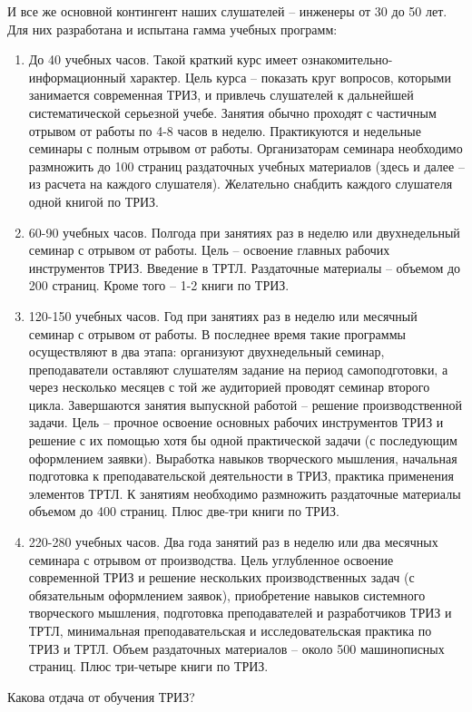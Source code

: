 \documentclass[11pt,a4paper]{article}
\begin{document}
И все же основной контингент наших слушателей -- инженеры от 30 до 50 лет. Для
них разработана и испытана гамма учебных программ:
\begin{enumerate}
\item До 40 учебных часов. Такой краткий курс имеет
  ознакомительно-информационный характер. Цель курса -- показать круг
  вопросов, которыми занимается современная ТРИЗ, и привлечь слушателей к
  дальнейшей систематической серьезной учебе. Занятия обычно проходят с
  частичным отрывом от работы по 4-8 часов в неделю. Практикуются и недельные
  семинары с полным отрывом от работы. Организаторам семинара необходимо
  размножить до 100 страниц раздаточных учебных материалов (здесь и далее --
  из расчета на каждого слушателя). Желательно снабдить каждого слушателя
  одной книгой по ТРИЗ.
\item 60-90 учебных часов. Полгода при занятиях раз в неделю или двухнедельный
  семинар с отрывом от работы. Цель -- освоение главных рабочих инструментов
  ТРИЗ. Введение в ТРТЛ. Раздаточные материалы -- объемом до 200
  страниц. Кроме того -- 1-2 книги по ТРИЗ.
\item 120-150 учебных часов. Год при занятиях раз в неделю или месячный
  семинар с отрывом от работы. В последнее время такие программы осуществляют
  в два этапа: организуют двухнедельный семинар, преподаватели оставляют
  слушателям задание на период самоподготовки, а через несколько месяцев с той
  же аудиторией проводят семинар второго цикла. Завершаются занятия выпускной
  работой -- решение производственной задачи. Цель -- прочное освоение
  основных рабочих инструментов ТРИЗ и решение с их помощью хотя бы одной
  практической задачи (с последующим оформлением заявки). Выработка навыков
  творческого мышления, начальная подготовка к преподавательской деятельности
  в ТРИЗ, практика применения элементов ТРТЛ. К занятиям необходимо размножить
  раздаточные материалы объемом до 400 страниц. Плюс две-три книги по ТРИЗ.
\item 220-280 учебных часов. Два года занятий раз в неделю или два месячных
  семинара с отрывом от производства. Цель углубленное освоение современной
  ТРИЗ и решение нескольких производственных задач (с обязательным оформлением
  заявок), приобретение навыков системного творческого мышления, подготовка
  преподавателей и разработчиков ТРИЗ и ТРТЛ, минимальная преподавательская и
  исследовательская практика по ТРИЗ и ТРТЛ. Объем раздаточных материалов --
  около 500 машинописных страниц. Плюс три-четыре книги по ТРИЗ.
\end{enumerate}
Какова отдача от обучения ТРИЗ?
\end{document}
